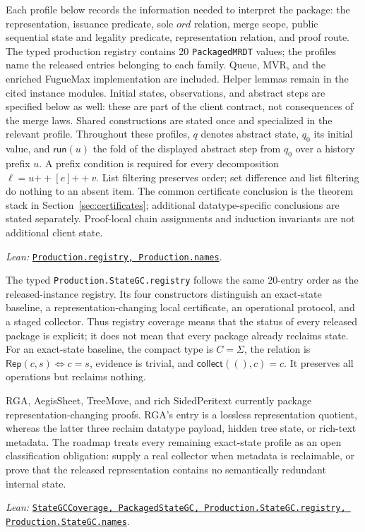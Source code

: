 \documentclass[11pt]{article}
\theoremstyle{definition}
\newcommand{\State}{\Sigma}
\newcommand{\lean}[1]{\texttt{#1}}
\newcommand{\src}[2]{\href{../../#1}{\texttt{#2}}}
\newcommand{\anchor}[2]{\par\smallskip\noindent\emph{Lean: }\src{#1}{#2}.}
\begin{document}
Each profile below records the information needed to interpret the package:
the representation, issuance predicate, sole $ord$ relation, merge scope,
public sequential state and legality predicate, representation relation, and
proof route. The typed production registry contains 20 \lean{PackagedMRDT}
values; the profiles name the released entries belonging to each family.
Queue, MVR, and the enriched FugueMax implementation are included. Helper
lemmas remain in the cited instance modules.
Initial states, observations, and abstract steps are specified below as well:
these are part of the client contract, not consequences of the merge laws.
Shared constructions are stated once and specialized in the relevant profile.
Throughout these profiles, $q$ denotes abstract state, $q_0$ its initial
value, and $\mathsf{run}(u)$ the fold of the displayed abstract step from
$q_0$ over a history prefix $u$. A prefix condition is required for every
decomposition $\ell=u{+\!+}[e]{+\!+}v$. List filtering preserves order;
set difference and list filtering do nothing to an absent item.
The common certificate conclusion is the theorem stack in
Section~\ref{sec:certificates};
additional datatype-specific conclusions are stated separately. Proof-local
chain assignments and induction invariants are not additional client state.
\anchor{Sal/MRDTs/Metatheory/ProductionLedger.lean}
  {Production.registry, Production.names}

The typed \lean{Production.StateGC.registry} follows the same 20-entry
order as the released-instance registry.  Its four constructors distinguish
an exact-state baseline, a representation-changing local certificate, an
operational protocol, and a staged collector.  Thus registry coverage means
that the status of every released package is explicit; it does not mean that
every package already reclaims state.
For an exact-state baseline, the compact type is $C=\State$, the relation is
$\mathsf{Rep}(c,s)\Longleftrightarrow c=s$, evidence is trivial, and
$\mathsf{collect}((),c)=c$. It preserves all operations but reclaims nothing.

RGA, AegisSheet, TreeMove, and rich SidedPeritext currently package
representation-changing proofs.  RGA's entry is a lossless representation
quotient, whereas the latter three reclaim datatype payload, hidden tree
state, or rich-text metadata.  The roadmap treats every remaining
exact-state profile as an open classification obligation: supply a real
collector when metadata is reclaimable, or prove that the released
representation contains no semantically redundant internal state.
\anchor{Sal/MRDTs/Metatheory/StateGCCoverage.lean}
  {StateGCCoverage, PackagedStateGC, Production.StateGC.registry,
   Production.StateGC.names}
\end{document}
